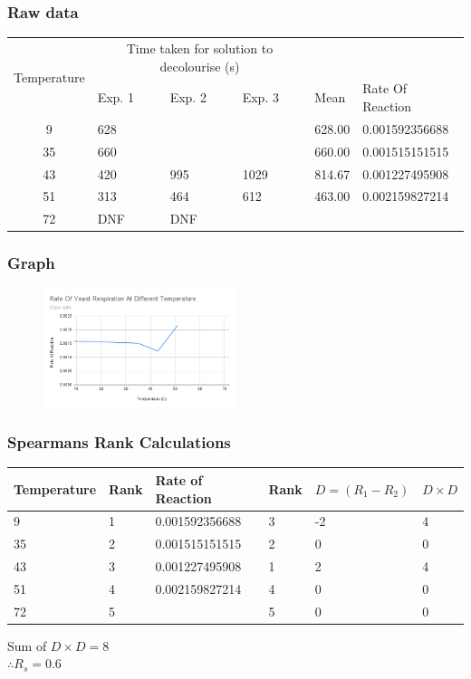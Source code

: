 \documentclass{thomasClass}
\begin{document}
\subsubsection{Raw data}
\begin{table}[H]
\begin{tabularx}{0.8\textwidth}{c|XXX|XX}
\multicolumn{1}{l}{\multirow{2}{*}{Temperature}} & \multicolumn{3}{c}{Time taken for solution to decolourise (s)} & \multicolumn{1}{l}{} & \multicolumn{1}{l}{} \\
\multicolumn{1}{l}{} & \multicolumn{1}{X}{Exp. 1} & \multicolumn{1}{X}{Exp. 2} & \multicolumn{1}{X}{Exp. 3} & \multicolumn{1}{l}{Mean} & \multicolumn{1}{l}{Rate Of Reaction} \\
\hline
9 & 628 &  &  & 628.00 & 0.001592356688 \\
35 & 660 &  &  & 660.00 & 0.001515151515 \\
43 & 420 & 995 & 1029 & 814.67 & 0.001227495908 \\
51 & 313 & 464 & 612 & 463.00 & 0.002159827214 \\
72 & DNF & DNF &  &  & \multicolumn{1}{c}{}
\end{tabularx}
\end{table}
\subsubsection{Graph}
\begin{figure}[H]
    \centering
    \includegraphics[width=0.5\textwidth]{RPA9-GRAPH1.png}
\end{figure}
\subsubsection{Spearmans Rank Calculations}
\begin{table}[H]
\begin{tabularx}{0.8\textwidth}{XX|XX|XX}
\multicolumn{1}{l}{Temperature} & \multicolumn{1}{l}{Rank} & \multicolumn{1}{l}{Rate of Reaction} & \multicolumn{1}{l}{Rank} & \multicolumn{1}{l}{$D=(R_1-R_2)$} & \multicolumn{1}{l}{$D\times D$} \\
\hline
9 & 1 & 0.001592356688 & 3 & -2 & 4 \\
35 & 2 & 0.001515151515 & 2 & 0 & 0 \\
43 & 3 & 0.001227495908 & 1 & 2 & 4 \\
51 & 4 & 0.002159827214 & 4 & 0 & 0 \\
72 & 5 & \multicolumn{1}{c}{} & 5 & 0 & 0
\end{tabularx}
\end{table}
Sum of $D\times D = 8$\\
$\therefore R_s=0.6$
\end{document}
